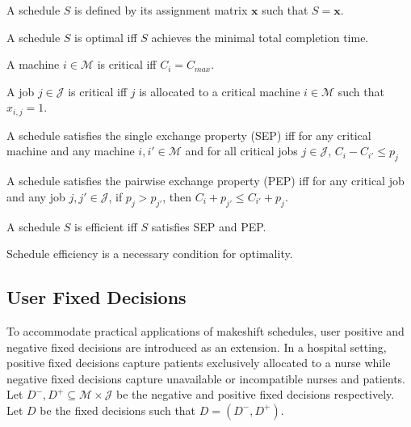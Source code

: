 \begin{definition}
	A schedule $S$ is defined by its assignment matrix $\mathbf{x}$ such that $S=\mathbf{x}$.
\end{definition}

\begin{definition}
	A schedule $S$ is optimal iff $S$ achieves the minimal total completion time.
\end{definition}


\begin{definition}
	A machine $i\in\mathcal{M}$ is critical iff $C_i=C_{max}$.
\end{definition}

\begin{definition}
	A job $j\in\mathcal{J}$ is critical iff $j$ is allocated to a critical machine $i\in\mathcal{M}$ such that $x_{i,j}=1$.
\end{definition}

\begin{definition}
	A schedule satisfies the single exchange property (SEP) iff for any critical machine and any machine $i,i'\in\mathcal{M}$ and for all critical jobs $j\in\mathcal{J}$, $C_i-C_{i'}\leq p_j$
\end{definition}

\begin{definition}
	A schedule satisfies the pairwise exchange property (PEP) iff for any critical job and any job $j,j'\in\mathcal{J}$, if $p_j>p_{j'}$, then $C_i+p_{j'}\leq C_{i'}+p_j$.
\end{definition}

\begin{definition}
	A schedule $S$ is efficient iff $S$ satisfies SEP and PEP.
\end{definition}

\begin{theorem}
	Schedule efficiency is a necessary condition for optimality.
\end{theorem}

\subsection{User Fixed Decisions}

To accommodate practical applications of makeshift schedules, user positive and negative fixed decisions are introduced as an extension. In a hospital setting, positive fixed decisions capture patients exclusively allocated to a nurse while negative fixed decisions capture unavailable or incompatible nurses and patients. Let $D^-,D^+\subseteq\mathcal{M}\times\mathcal{J}$ be the negative and positive fixed decisions respectively. Let $D$ be the fixed decisions such that $D=(D^-,D^+)$.

